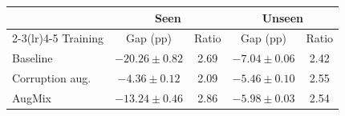 \begin{tabular}{lcccc}
\toprule
& \multicolumn{2}{c}{Seen} & \multicolumn{2}{c}{Unseen} \\
\cmidrule(lr){2-3}\cmidrule(lr){4-5}
Training & Gap (pp) & Ratio & Gap (pp) & Ratio \\
\midrule
Baseline & $-20.26 \pm 0.82$ & 2.69 & $-7.04 \pm 0.06$ & 2.42 \\
Corruption aug. & $-4.36 \pm 0.12$ & 2.09 & $-5.46 \pm 0.10$ & 2.55 \\
AugMix & $-13.24 \pm 0.46$ & 2.86 & $-5.98 \pm 0.03$ & 2.54 \\
\bottomrule
\end{tabular}
